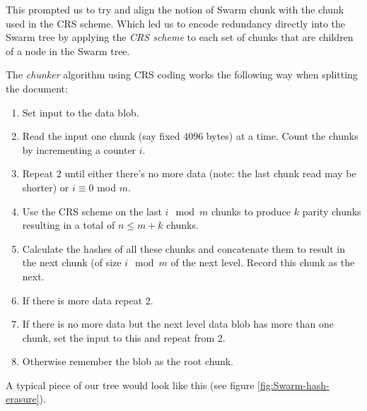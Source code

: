 This prompted us to try and align the notion of Swarm chunk with the chunk used in the CRS scheme. Which led us to encode redundancy directly into the Swarm tree by applying the \emph{CRS scheme} to each set of chunks that are children of a node in the Swarm tree.

The \emph{chunker} algorithm using CRS coding works the following way when splitting the document:

\begin{enumerate}
\item Set input to the data blob.
\item Read the input one chunk (say fixed 4096 bytes) at a time. Count the chunks by incrementing a counter $i$. 
\item Repeat 2 until either there's no more data (note: the last chunk read may be shorter) or $i \equiv 0$ mod $m$.
\item Use the CRS scheme on the last $i \mod m$ chunks to produce $k$ parity chunks resulting in a total of $n \leq m+k$ chunks.
\item Calculate the hashes of all these chunks and concatenate them to result in the next chunk (of size $i\mod m$ of the next level. Record this chunk as the next.
\item If there is more data repeat 2. 
\item If there is no more data but the next level data blob has more than one chunk, set the input to this and repeat from 2.
\item Otherwise remember the blob as the root chunk.
\end{enumerate}


A typical piece of our tree would look like this (see figure \ref{fig:Swarm-hash-erasure}).


